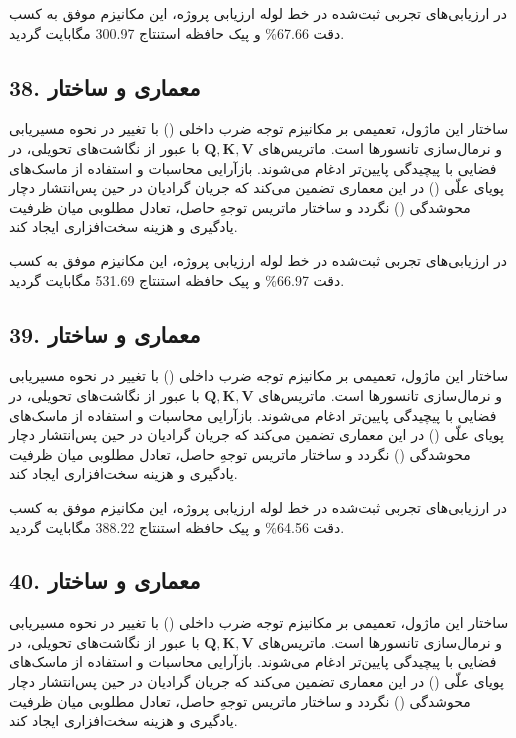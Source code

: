 \documentclass[12pt,a4paper]{report}
\theoremstyle{definition}
\begin{document}
در ارزیابی‌های تجربی ثبت‌شده در خط لوله ارزیابی پروژه، این مکانیزم موفق به کسب دقت 67.66\% و پیک حافظه استنتاج 300.97 مگابایت گردید.

\subsection*{38. معماری و ساختار }
ساختار این ماژول، تعمیمی بر مکانیزم توجه ضرب داخلی () با تغییر در نحوه مسیریابی و نرمال‌سازی تانسورها است. ماتریس‌های $\mathbf{Q, K, V}$ با عبور از نگاشت‌های تحویلی، در فضایی با پیچیدگی پایین‌تر ادغام می‌شوند. بازآرایی محاسبات و استفاده از ماسک‌های پویای علّی () در این معماری تضمین می‌کند که جریان گرادیان در حین پس‌انتشار دچار محوشدگی () نگردد و ساختار ماتریس توجهِ حاصل، تعادل مطلوبی میان ظرفیت یادگیری و هزینه سخت‌افزاری ایجاد کند.

در ارزیابی‌های تجربی ثبت‌شده در خط لوله ارزیابی پروژه، این مکانیزم موفق به کسب دقت 66.97\% و پیک حافظه استنتاج 531.69 مگابایت گردید.

\subsection*{39. معماری و ساختار }
ساختار این ماژول، تعمیمی بر مکانیزم توجه ضرب داخلی () با تغییر در نحوه مسیریابی و نرمال‌سازی تانسورها است. ماتریس‌های $\mathbf{Q, K, V}$ با عبور از نگاشت‌های تحویلی، در فضایی با پیچیدگی پایین‌تر ادغام می‌شوند. بازآرایی محاسبات و استفاده از ماسک‌های پویای علّی () در این معماری تضمین می‌کند که جریان گرادیان در حین پس‌انتشار دچار محوشدگی () نگردد و ساختار ماتریس توجهِ حاصل، تعادل مطلوبی میان ظرفیت یادگیری و هزینه سخت‌افزاری ایجاد کند.

در ارزیابی‌های تجربی ثبت‌شده در خط لوله ارزیابی پروژه، این مکانیزم موفق به کسب دقت 64.56\% و پیک حافظه استنتاج 388.22 مگابایت گردید.

\subsection*{40. معماری و ساختار }
ساختار این ماژول، تعمیمی بر مکانیزم توجه ضرب داخلی () با تغییر در نحوه مسیریابی و نرمال‌سازی تانسورها است. ماتریس‌های $\mathbf{Q, K, V}$ با عبور از نگاشت‌های تحویلی، در فضایی با پیچیدگی پایین‌تر ادغام می‌شوند. بازآرایی محاسبات و استفاده از ماسک‌های پویای علّی () در این معماری تضمین می‌کند که جریان گرادیان در حین پس‌انتشار دچار محوشدگی () نگردد و ساختار ماتریس توجهِ حاصل، تعادل مطلوبی میان ظرفیت یادگیری و هزینه سخت‌افزاری ایجاد کند.
\end{document}
